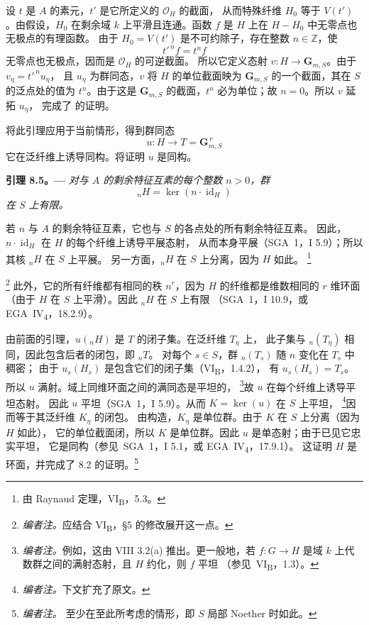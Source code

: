 设 \(t\) 是 \(A\) 的素元，\(t'\) 是它所定义的 \(\mathcal O_H\) 的截面，
从而特殊纤维 \(H_0\) 等于 \(V(t')\)。由假设，\(H_0\) 在剩余域 \(k\)
上平滑且连通。函数 \(f\) 是 \(H\) 上在 \(H-H_0\) 中无零点也无极点的有理函数。
由于 \(H_0=V(t')\) 是不可约除子，存在整数 \(n\in\mathbb{Z}\)，使
\[
  t'^{\,n}f=t^n f
\]
无零点也无极点，因而是 \(\mathcal O_H\) 的可逆截面。
所以它定义态射 \(v:H\to\mathbf{G}_{m,S}\)。由于 \(v_\eta=t'^{\,n}u_\eta\)，
且 \(u_\eta\) 为群同态，\(v\) 将 \(H\) 的单位截面映为 \(\mathbf{G}_{m,S}\)
的一个截面，其在 \(S\) 的泛点处的值为 \(t^n\)。由于这是 \(\mathbf{G}_{m,S}\)
的截面，\(t^n\) 必为单位；故 \(n=0\)。所以 \(v\) 延拓 \(u_\eta\)，
完成了  的证明。

将此引理应用于当前情形，得到群同态
\[
  u:H\longrightarrow T=\mathbf{G}_{m,S}^{\,r}
\]
它在泛纤维上诱导同构。将证明 \(u\) 是同构。

\par\medskip\noindent{}\textbf{引理 8.5。---}\enspace
\emph{对与 \(A\) 的剩余特征互素的每个整数 \(n>0\)，群
\[
  {}_nH=\ker(n\cdot\operatorname{id}_H)
\]
在 \(S\) 上有限。}

若 \(n\) 与 \(A\) 的剩余特征互素，它也与 \(S\) 的各点处的所有剩余特征互素。
因此，\(n\cdot\operatorname{id}_H\) 在 \(H\) 的每个纤维上诱导平展态射，
从而本身平展（SGA~1，I 5.9）；所以其核 \({}_nH\) 在 \(S\) 上平展。
另一方面，\({}_nH\) 在 \(S\) 上分离，因为 \(H\) 如此。
\begingroup
\renewcommand{\thefootnote}{\(\ast\)}
\footnote{由 Raynaud 定理，VI\textsubscript{B}，5.3。}
\endgroup
\addtocounter{footnote}{-1}%
\footnote{\textit{编者注。}应结合 VI\textsubscript{B}，\S5 的修改展开这一点。}
此外，它的所有纤维都有相同的秩 \(n^r\)，因为 \(H\) 的纤维都是维数相同的
\(r\) 维环面（由于 \(H\) 在 \(S\) 上平滑）。因此 \({}_nH\) 在 \(S\) 上有限
（SGA~1，I 10.9，或 EGA~IV\textsubscript{4}，18.2.9）。

由前面的引理，\(u({}_nH)\) 是 \(T\) 的闭子集。在泛纤维 \(T_\eta\) 上，
此子集与 \({}_n(T_\eta)\) 相同，因此包含后者的闭包，即 \({}_nT\)。
对每个 \(s\in S\)，群 \({}_n(T_s)\) 随 \(n\) 变化在 \(T_s\) 中稠密；
由于 \(u_s(H_s)\) 是包含它们的闭子集（VI\textsubscript{B}，1.4.2），
有 \(u_s(H_s)=T_s\)。所以 \(u\) 满射。域上同维环面之间的满同态是平坦的，
\footnote{\textit{编者注。}例如，这由 VIII 3.2(a) 推出。更一般地，若 \(f:G\to H\)
是域 \(k\) 上代数群之间的满射态射，且 \(H\) 约化，则 \(f\) 平坦
（参见\ VI\textsubscript{B}，1.3）。}故 \(u\) 在每个纤维上诱导平坦态射。
因此 \(u\) 平坦（SGA~1，I 5.9）。从而 \(K=\ker(u)\) 在 \(S\) 上平坦，
\footnote{\textit{编者注。}下文扩充了原文。}因而等于其泛纤维 \(K_\eta\) 的闭包。
由构造，\(K_\eta\) 是单位群。由于 \(K\) 在 \(S\) 上分离（因为 \(H\) 如此），
它的单位截面闭，所以 \(K\) 是单位群。因此 \(u\) 是单态射；由于已见它忠实平坦，
它是同构（参见\ SGA~1，I 5.1，或 EGA~IV\textsubscript{4}，17.9.1）。
这证明 \(H\) 是环面，并完成了 8.2 的证明。\footnote{\textit{编者注。}
至少在至此所考虑的情形，即 \(S\) 局部 Noether 时如此。}

